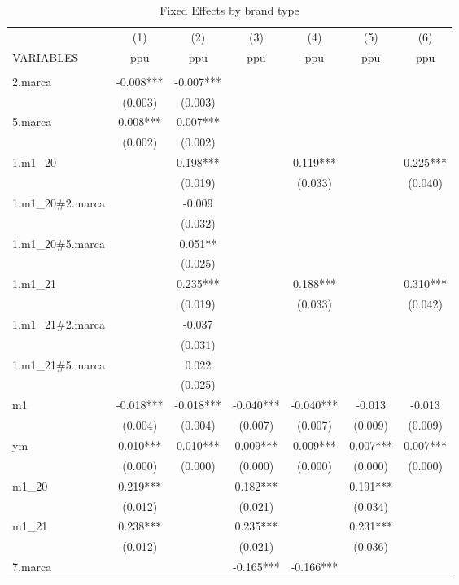 \begin{longtable}{lcccccc} \hline
	\caption{Fixed Effects by brand type}\label{tab:2}\\	
	\hline
 & (1) & (2) & (3) & (4) & (5) & (6) \\
VARIABLES & ppu & ppu & ppu & ppu & ppu & ppu \\ \hline
 &  &  &  &  &  &  \\
2.marca & -0.008*** & -0.007*** &  &  &  &  \\
 & (0.003) & (0.003) &  &  &  &  \\
5.marca & 0.008*** & 0.007*** &  &  &  &  \\
 & (0.002) & (0.002) &  &  &  &  \\
1.m1\_20 &  & 0.198*** &  & 0.119*** &  & 0.225*** \\
 &  & (0.019) &  & (0.033) &  & (0.040) \\
1.m1\_20\#2.marca &  & -0.009 &  &  &  &  \\
 &  & (0.032) &  &  &  &  \\
1.m1\_20\#5.marca &  & 0.051** &  &  &  &  \\
 &  & (0.025) &  &  &  &  \\
1.m1\_21 &  & 0.235*** &  & 0.188*** &  & 0.310*** \\
 &  & (0.019) &  & (0.033) &  & (0.042) \\
1.m1\_21\#2.marca &  & -0.037 &  &  &  &  \\
 &  & (0.031) &  &  &  &  \\
1.m1\_21\#5.marca &  & 0.022 &  &  &  &  \\
 &  & (0.025) &  &  &  &  \\
m1 & -0.018*** & -0.018*** & -0.040*** & -0.040*** & -0.013 & -0.013 \\
 & (0.004) & (0.004) & (0.007) & (0.007) & (0.009) & (0.009) \\
ym & 0.010*** & 0.010*** & 0.009*** & 0.009*** & 0.007*** & 0.007*** \\
 & (0.000) & (0.000) & (0.000) & (0.000) & (0.000) & (0.000) \\
m1\_20 & 0.219*** &  & 0.182*** &  & 0.191*** &  \\
 & (0.012) &  & (0.021) &  & (0.034) &  \\
m1\_21 & 0.238*** &  & 0.235*** &  & 0.231*** &  \\
 & (0.012) &  & (0.021) &  & (0.036) &  \\
7.marca &  &  & -0.165*** & -0.166*** &  &  \\

\end{longtable}
